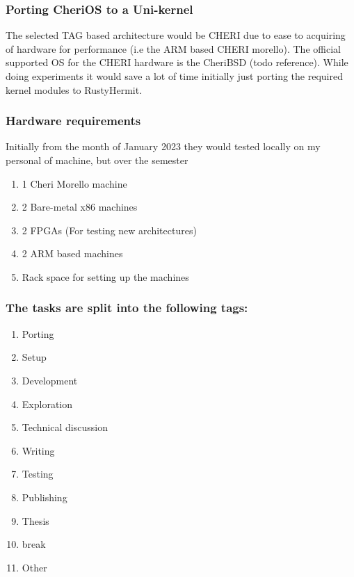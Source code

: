 \subsubsection{Porting CheriOS to a Uni-kernel}
The selected TAG based architecture would be CHERI due to ease to acquiring of hardware 
for performance (i.e the ARM based CHERI morello). The official supported OS for 
the CHERI hardware is the CheriBSD (todo reference). While doing experiments it 
would save a lot of time initially just porting the required kernel modules to 
RustyHermit.

\subsubsection{Hardware requirements}
Initially from the month of January 2023 they would tested locally on 
my personal of machine, but over the semester 
\begin{enumerate}
  \item 1 Cheri Morello machine 
  \item 2 Bare-metal x86 machines
  \item 2 FPGAs (For testing new architectures)
  \item 2 ARM based machines
  \item Rack space for setting up the machines 
\end{enumerate}

\subsubsection{The tasks are split into the following tags:}
\begin{enumerate}
  \item Porting 
  \item Setup
  \item Development
  \item Exploration 
  \item Technical discussion 
  \item Writing
  \item Testing
  \item Publishing
  \item Thesis
  \item break
  \item Other
\end{enumerate}



